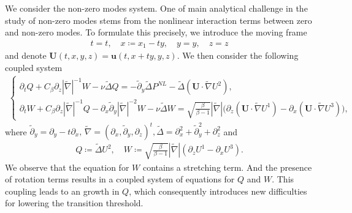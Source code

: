 \documentclass[11pt,reqno]{article}
\numberwithin{equation}{section}
\newcommand\x{\bm{x}}
\newcommand\uu{\bm{u}}
\newcommand\U{\bm{U}}
\newcommand \tri {\coloneqq}
\let\pa=\partial
\let\f=\frac
\begin{document}
We consider the non-zero modes system. One of main analytical challenge in the study of non-zero modes stems from the nonlinear interaction terms between zero and non-zero modes. 
To formulate this precisely, we introduce the moving frame
\begin{align*}
t= t,\quad x\tri x_1-ty,\quad y= y,\quad z=z
\end{align*}
and denote $\U(t,x,y,z)=\uu(t,x+ty,y,z).$
We then consider the following coupled system %
\begin{align*} 
	\left\{\begin{array}{l}
		\pa_t Q +C_{\beta} \pa_{z} |\widetilde{\nabla}| ^{-1}W-\nu \widetilde{\Delta}Q
		=-\tilde{\pa}_y \widetilde{\Delta} P^{NL}-\widetilde{\Delta}(\U\cdot\widetilde{\nabla}U^2),
		\\[1ex]
		\pa_t W+C_{\beta} \pa_{z} |\widetilde{\nabla}| ^{-1}Q
		-\pa_x\tilde{\pa}_y |\widetilde{\nabla}| ^{-2}W
		-\nu \widetilde{\Delta}W
		=\sqrt{\f{\beta}{\beta-1}} |\widetilde{\nabla}| 
		\big(
		\pa_{z}(\U\cdot\widetilde{\nabla}U^1)-\pa_{x}(\U\cdot\widetilde{\nabla}U^3)
		\big),
	\end{array}\right.
\end{align*}
where $\tilde{\pa}_y =\pa_y-t\pa_x, \, \widetilde{\nabla}=(\pa_x, \tilde{\pa}_y, \pa_z)^t, \widetilde{\Delta}=\pa_x^2+\tilde{\pa}_y^2+\pa_z^2$ and %
\begin{align*}	
Q\tri \widetilde{\Delta} U^2,	\quad	W\tri \sqrt{\f{\beta}{\beta-1}} |\widetilde{\nabla} |(\pa_{z} U^1-\pa_{x} U^3).
\end{align*}
We observe that the equation for $W$ contains a stretching term. And the presence of rotation terms results in a coupled system of equations for $Q$ and $W$.
This coupling leads to an growth in $Q$, which consequently introduces new difficulties for lowering the transition threshold.
\end{document}
